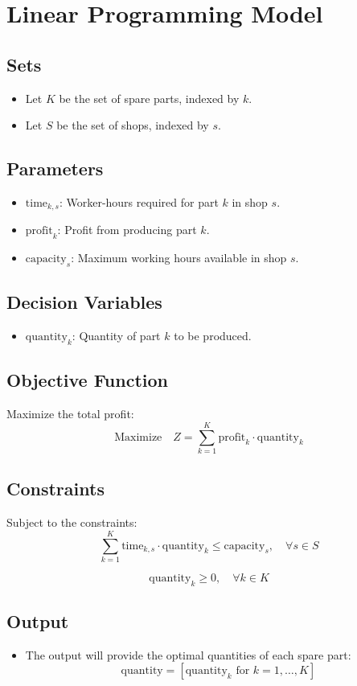 \documentclass{article}
\begin{document}
\section*{Linear Programming Model}

\subsection*{Sets}
\begin{itemize}
    \item Let \( K \) be the set of spare parts, indexed by \( k \).
    \item Let \( S \) be the set of shops, indexed by \( s \).
\end{itemize}

\subsection*{Parameters}
\begin{itemize}
    \item \( \text{time}_{k,s} \): Worker-hours required for part \( k \) in shop \( s \).
    \item \( \text{profit}_{k} \): Profit from producing part \( k \).
    \item \( \text{capacity}_{s} \): Maximum working hours available in shop \( s \).
\end{itemize}

\subsection*{Decision Variables}
\begin{itemize}
    \item \( \text{quantity}_{k} \): Quantity of part \( k \) to be produced.
\end{itemize}

\subsection*{Objective Function}
Maximize the total profit:
\[
\text{Maximize} \quad Z = \sum_{k=1}^{K} \text{profit}_{k} \cdot \text{quantity}_{k}
\]

\subsection*{Constraints}
Subject to the constraints:
\[
\sum_{k=1}^{K} \text{time}_{k,s} \cdot \text{quantity}_{k} \leq \text{capacity}_{s}, \quad \forall s \in S
\]

\[
\text{quantity}_{k} \geq 0, \quad \forall k \in K
\]

\subsection*{Output}
\begin{itemize}
    \item The output will provide the optimal quantities of each spare part:
    \[
    \text{quantity} = [\text{quantity}_{k} \text{ for } k = 1, \ldots, K]
    \]
\end{itemize}
\end{document}
